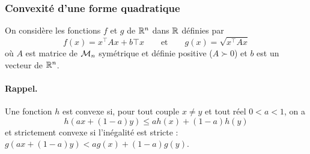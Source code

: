 \subsubsection{Convexité d'une forme quadratique}

On considère les fonctions $f$ et $g$ de $\mathbb{R}^n$ dans $\mathbb{R}$ définies par 
$$
f(x) = x^\top A x + b\top x
\qquad \text{et} \qquad
g(x) = \sqrt{x^\top A x}
$$
où $A$ est matrice de $\mathcal{M}_n$ symétrique et définie positive ($A \succ 0$) et $b$ est un vecteur de $\mathbb{R}^n$.

\paragraph{Rappel.} 
Une fonction $h$ est convexe si, pour tout couple $x \neq y$ et tout réel $0 < a < 1$, on a
$$
h\left(a x + (1-a) y\right) \leq a h(x) + (1-a) h(y)
$$
et strictement convexe si l'inégalité est stricte : $g(a x + (1-a) y) < a g(x) + (1-a) g(y)$.

